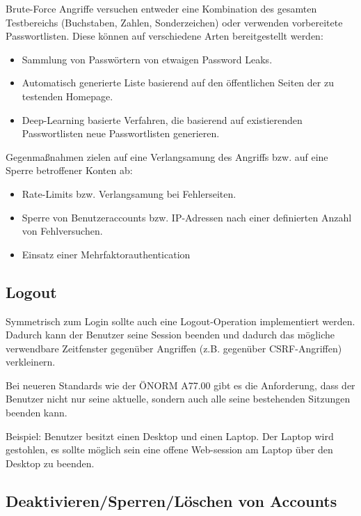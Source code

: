 Brute-Force Angriffe versuchen entweder eine Kombination des gesamten Testbereichs (Buchstaben, Zahlen, Sonderzeichen) oder verwenden vorbereitete Passwortlisten. Diese können auf verschiedene Arten bereitgestellt werden:

\begin{itemize}
	\item Sammlung von Passwörtern von etwaigen Password Leaks.
	\item Automatisch generierte Liste basierend auf den öffentlichen Seiten der zu testenden Homepage.
	\item Deep-Learning basierte Verfahren, die basierend auf existierenden Passwortlisten neue Passwortlisten generieren.
\end{itemize}

Gegenmaßnahmen zielen auf eine Verlangsamung des Angriffs bzw. auf eine Sperre betroffener Konten ab:

\begin{itemize}
	\item Rate-Limits bzw. Verlangsamung bei Fehlerseiten.
	\item Sperre von Benutzeraccounts bzw. IP-Adressen nach einer definierten Anzahl von Fehlversuchen.
	\item Einsatz einer Mehrfaktorauthentication
\end{itemize}

\subsection{Logout}

Symmetrisch zum Login sollte auch eine Logout-Operation implementiert werden. Dadurch kann der Benutzer seine Session beenden und dadurch das mögliche verwendbare Zeitfenster gegenüber Angriffen (z.B. gegenüber CSRF-Angriffen) verkleinern.

Bei neueren Standards wie der ÖNORM A77.00 gibt es die Anforderung, dass der Benutzer nicht nur seine aktuelle, sondern auch alle seine bestehenden Sitzungen beenden kann.

Beispiel: Benutzer besitzt einen Desktop und einen Laptop. Der Laptop wird gestohlen, es sollte möglich sein eine offene Web-session am Laptop über den Desktop zu beenden.

\subsection{Deaktivieren/Sperren/Löschen von Accounts}

